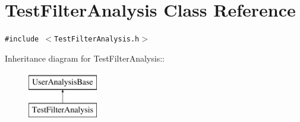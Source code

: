 \hypertarget{classTestFilterAnalysis}{
\section{Test\-Filter\-Analysis Class Reference}
\label{classTestFilterAnalysis}
}
{\tt \#include $<$Test\-Filter\-Analysis.h$>$}

Inheritance diagram for Test\-Filter\-Analysis::\begin{figure}[H]
\begin{center}
\leavevmode
\includegraphics[height=2cm]{classTestFilterAnalysis}
\end{center}
\end{figure}
